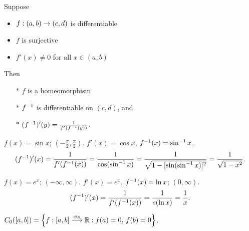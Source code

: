 \documentclass[]{article}
\begin{document}
\begin{theorem}
	Suppose
	\begin{itemize}
		\item $f:(a,b)\rightarrow(c,d)$ is differentiable
		\item $f$ is surjective
		\item $f'(x)\neq0$ for all $x\in(a,b)$
	\end{itemize}
	Then
	\begin{enumerate}
		\item[$*$] $f$ is a homeomorphism
		\item[$*$] $f^{-1}$ is differentiable on $(c,d)$, and
		\item[$*$] $(f^{-1})'(y) = \frac1{f'(f^{-1}(y))}$.
	\end{enumerate}
\end{theorem}
\begin{example}
	$f(x) = \sin x$; $(-\frac\pi2,\frac\pi2)$.
	$f'(x) = \cos x$, $f^{-1}(x) = \sin^{-1} x$.
	$$ (f^{-1})'(x) = \frac1{f'(f^{-1}(x))} = \frac1{\cos(\sin^{-1} x)} = \frac1{\sqrt{1-[\sin(\sin^{-1} x)]^2}} = \frac1{\sqrt{1-x^2}}.$$
\end{example}
\begin{example}
	$f(x) = e^x$; $(-\infty,\infty)$.
	$f'(x) = e^x$, $f^{-1}(x)=\ln x$; $(0,\infty)$.
	$$(f^{-1})'(x) = \frac1{f'(f^{-1}(x))} = \frac1{e(\ln x)} = \frac1x.$$
\end{example}

$C_0([a,b]) = \left\{ f:[a,b]\overset{\text{cts}}{\longrightarrow}\mathbb{R} : f(a)=0,\,f(b)=0 \right\}$.
\end{document}
